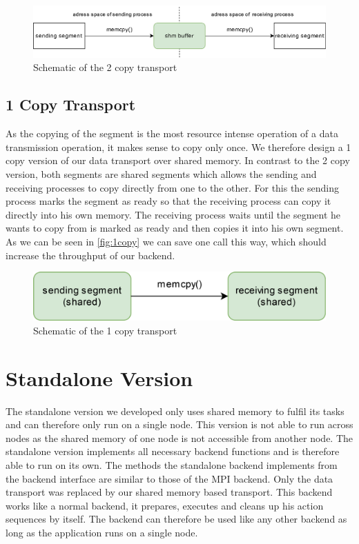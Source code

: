 \begin{figure}[h]
	\centering
	\includegraphics[width=1.00\columnwidth]{figures/2copy.png}
	\caption{Schematic of the 2 copy transport}
	\label{fig:2copy}
\end{figure}

\subsection{1 Copy Transport}

As the copying of the segment is the most resource intense operation of a data transmission operation, it makes sense to copy only once.
We therefore design a 1 copy version of our data transport over shared memory.
In contrast to the 2 copy version, both segments are shared segments which allows the sending and receiving processes to copy directly from one to the other.
For this the sending process marks the segment as ready so that the receiving process can copy it directly into his own memory. 
The receiving process waits until the segment he wants to copy from is marked as ready and then copies it into his own segment.
As we can be seen in \autoref{fig:1copy} we can save one  call this way, which should increase the throughput of our backend.

\begin{figure}[h]
	\centering
	\includegraphics[width=0.66\columnwidth]{figures/1copy.png}
	\caption{Schematic of the 1 copy transport}
	\label{fig:1copy}
\end{figure}


\section{Standalone Version}

The standalone version we developed only uses shared memory to fulfil its tasks and can therefore only run on a single node.
This version is not able to run across nodes as the shared memory of one node is not accessible from another node.
The standalone version implements all necessary backend functions and is therefore able to run on its own.
The methods the standalone backend implements from the backend interface are similar to those of the MPI backend. 
Only the data transport was replaced by our shared memory based transport.
This backend works like a normal backend, it prepares, executes and cleans up his action sequences by itself.
The backend can therefore be used like any other backend as long as the application runs on a single node.

